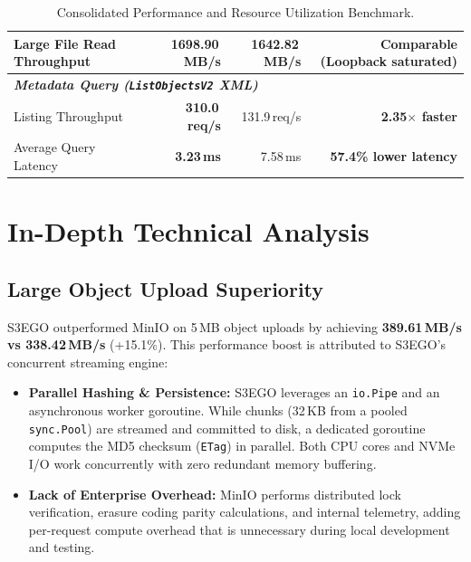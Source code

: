\documentclass[11pt,a4paper]{article}
\begin{document}
\begin{table}[h!]
\begin{tabularx}{\textwidth}{l r r r}
Large File Read Throughput & \textbf{1698.90\,MB/s} & 1642.82\,MB/s & Comparable (Loopback saturated) \\
\midrule
\multicolumn{4}{l}{\textit{\textbf{Metadata Query (\texttt{ListObjectsV2} XML)}}} \\
Listing Throughput & \textbf{310.0\,req/s} & 131.9\,req/s & \textcolor{blue!80!black}{\textbf{2.35$\times$ faster}} \\
Average Query Latency & \textbf{3.23\,ms} & 7.58\,ms & \textcolor{blue!80!black}{\textbf{57.4\% lower latency}} \\
\bottomrule
\end{tabularx}
\caption{Consolidated Performance and Resource Utilization Benchmark.}
\label{tab:bench_results}
\end{table}

\section{In-Depth Technical Analysis}

\subsection{Large Object Upload Superiority}
S3EGO outperformed MinIO on 5\,MB object uploads by achieving \textbf{389.61\,MB/s vs 338.42\,MB/s} (+15.1\%). This performance boost is attributed to S3EGO's concurrent streaming engine:
\begin{itemize}
    \item \textbf{Parallel Hashing \& Persistence:} S3EGO leverages an \texttt{io.Pipe} and an asynchronous worker goroutine. While chunks (32\,KB from a pooled \texttt{sync.Pool}) are streamed and committed to disk, a dedicated goroutine computes the MD5 checksum (\texttt{ETag}) in parallel. Both CPU cores and NVMe I/O work concurrently with zero redundant memory buffering.
    \item \textbf{Lack of Enterprise Overhead:} MinIO performs distributed lock verification, erasure coding parity calculations, and internal telemetry, adding per-request compute overhead that is unnecessary during local development and testing.
\end{itemize}
\end{document}

